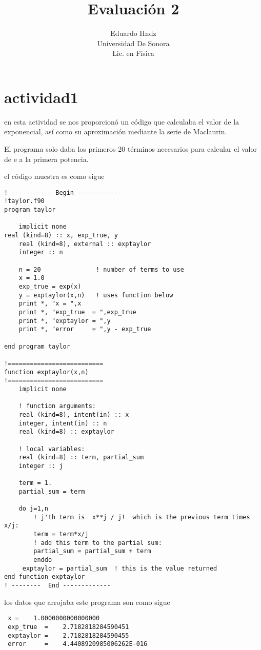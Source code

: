 \documentclass{article}
\title{Evaluación 2}
\author{Eduardo Hndz\\Universidad De Sonora\\Lic. en Física}
\begin{document}
\maketitle
\section{actividad1}
en esta actividad se nos proporcionó un código que calculaba el valor de la exponencial, así como su aproximación mediante la serie de Maclaurin.

El programa solo daba los primeros 20 términos necesarios para calcular el valor de e a la primera potencia.

el código muestra es como sigue
\begin{verbatim}
! ----------- Begin ------------
!taylor.f90
program taylor

    implicit none                  
real (kind=8) :: x, exp_true, y
    real (kind=8), external :: exptaylor
    integer :: n

    n = 20               ! number of terms to use
    x = 1.0
    exp_true = exp(x)
    y = exptaylor(x,n)   ! uses function below
    print *, "x = ",x
    print *, "exp_true  = ",exp_true
    print *, "exptaylor = ",y
    print *, "error     = ",y - exp_true

end program taylor

!==========================
function exptaylor(x,n)
!==========================
    implicit none

    ! function arguments:
    real (kind=8), intent(in) :: x
    integer, intent(in) :: n
    real (kind=8) :: exptaylor

    ! local variables:
    real (kind=8) :: term, partial_sum
    integer :: j

    term = 1.
    partial_sum = term

    do j=1,n
        ! j'th term is  x**j / j!  which is the previous term times x/j:
        term = term*x/j   
        ! add this term to the partial sum:
        partial_sum = partial_sum + term   
        enddo
     exptaylor = partial_sum  ! this is the value returned
end function exptaylor
! --------  End -------------
\end{verbatim}

los datos que arrojaba este programa son como sigue
\begin{verbatim}
 x =    1.0000000000000000     
 exp_true  =    2.7182818284590451     
 exptaylor =    2.7182818284590455     
 error     =    4.4408920985006262E-016
\end{verbatim}
\end{document}
